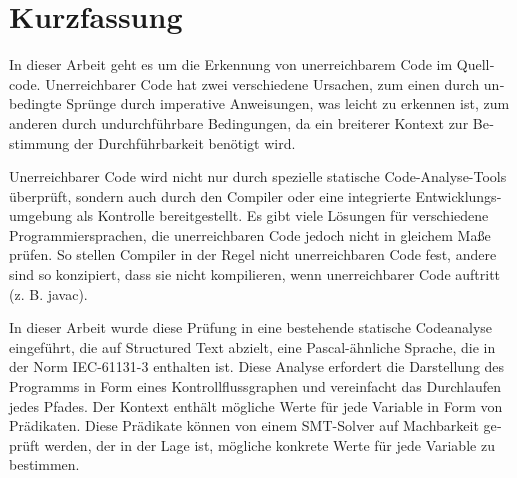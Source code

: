 \chapter{Kurzfassung}

\begin{german}
In dieser Arbeit geht es um die Erkennung von unerreichbarem Code im Quellcode. 
Unerreichbarer Code hat zwei verschiedene Ursachen, zum einen durch unbedingte Sprünge durch imperative Anweisungen, was leicht zu erkennen ist, zum anderen durch undurchführbare Bedingungen, da ein breiterer Kontext zur Bestimmung der Durchführbarkeit benötigt wird.

Unerreichbarer Code wird nicht nur durch spezielle statische Code-Analyse-Tools überprüft, sondern auch durch den Compiler oder eine integrierte Entwicklungsumgebung als Kontrolle bereitgestellt. Es gibt viele Lösungen für verschiedene Programmiersprachen, die unerreichbaren Code jedoch nicht in gleichem Maße prüfen. So stellen Compiler in der Regel nicht unerreichbaren Code fest, andere sind so konzipiert, dass sie nicht kompilieren, wenn unerreichbarer Code auftritt (z. B. javac).


In dieser Arbeit wurde diese Prüfung in eine bestehende statische Codeanalyse eingeführt, die auf Structured Text abzielt, eine Pascal-ähnliche Sprache, die in der Norm IEC-61131-3 enthalten ist. Diese Analyse erfordert die Darstellung des Programms in Form eines Kontrollflussgraphen und vereinfacht das Durchlaufen jedes Pfades. Der Kontext enthält mögliche Werte für jede Variable in Form von Prädikaten. Diese Prädikate können von einem SMT-Solver auf Machbarkeit geprüft werden, der in der Lage ist, mögliche konkrete Werte für jede Variable zu bestimmen. 

\end{german}